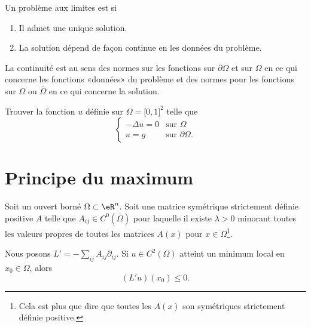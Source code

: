 \begin{definition}      \label{DEFooSNIRooBFYSFh}
	Un problème aux limites est  si
	\begin{enumerate}
		\item
		      Il admet une unique solution.
		\item
		      La solution dépend de façon continue en les données du problème.
	\end{enumerate}
	La continuité est au sens des normes sur les fonctions sur \( \partial\Omega\) et sur \( \Omega\) en ce qui concerne les fonctions «données» du problème et des normes pour les fonctions sur \( \Omega\) ou \( \bar\Omega\) en ce qui concerne la solution.
\end{definition}

\begin{example}
	Trouver la fonction \( u\) définie sur \( \Omega= \mathopen[ 0 , 1 \mathclose]^2\) telle que
	\begin{equation}
		\begin{cases}
			-\Delta u=0 & \text{sur } \Omega          \\
			u=g         & \text{sur }\partial \Omega.
		\end{cases}
	\end{equation}

\end{example}

\section{Principe du maximum}

\begin{lemma}        \label{LEMooSPVUooDQOeom}
	Soit un ouvert borné \( \Omega\subset \eR^n\). Soit une matrice symétrique strictement définie positive \( A\) telle que \( A_{ij}\in C^0(\bar \Omega)\) pour laquelle il existe \( \lambda>0\) minorant toutes les valeurs propres de toutes les matrices \( A(x)\) pour \( x\in \Omega\)\footnote{Cela est plus que dire que toutes les \( A(x)\) son symétriques strictement définie positive.}.

	Nous posons \( L'=-\sum_{ij}A_{ij}\partial_{ij}\). Si \( u\in C^2(\Omega)\) atteint un minimum local en \( x_0\in \Omega\), alors
	\begin{equation}
		(L'u)(x_0)\leq 0.
	\end{equation}
\end{lemma}

